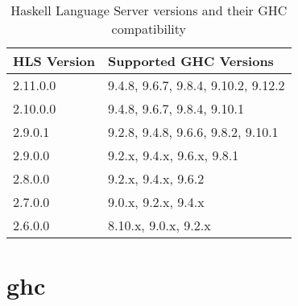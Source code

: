 \documentclass[openany, 12pt]{book}
\begin{document}
\begin{table}[h]
	\centering
	\begin{tabular}{ll}
		\toprule
		\textbf{HLS Version} & \textbf{Supported GHC Versions}     \\
		\midrule
		2.11.0.0             & 9.4.8, 9.6.7, 9.8.4, 9.10.2, 9.12.2 \\
		2.10.0.0             & 9.4.8, 9.6.7, 9.8.4, 9.10.1         \\
		2.9.0.1              & 9.2.8, 9.4.8, 9.6.6, 9.8.2, 9.10.1  \\
		2.9.0.0              & 9.2.x, 9.4.x, 9.6.x, 9.8.1          \\
		2.8.0.0              & 9.2.x, 9.4.x, 9.6.2                 \\
		2.7.0.0              & 9.0.x, 9.2.x, 9.4.x                 \\
		2.6.0.0              & 8.10.x, 9.0.x, 9.2.x                \\
		\bottomrule
	\end{tabular}
	\caption{Haskell Language Server versions and their GHC compatibility}
\end{table}


\chapter{ghc}
\end{document}
